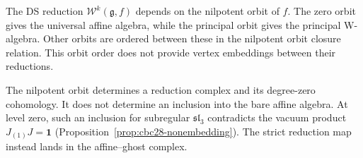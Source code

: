 The DS reduction $\mathcal{W}^k(\mathfrak{g},f)$ depends on the nilpotent orbit of $f$.
The zero orbit gives the universal affine algebra, while the principal orbit gives the principal W-algebra.
Other orbits are ordered between these in the nilpotent orbit closure relation.
This orbit order does not provide vertex embeddings between their reductions.

\begin{remark}
The nilpotent orbit determines a reduction complex and its degree-zero cohomology.
It does not determine an inclusion into the bare affine algebra.
At level zero, such an inclusion for subregular $\mathfrak{sl}_3$ contradicts the vacuum product $J_{(1)}J=\mathbf1$
(Proposition~\ref{prop:cbc28-nonembedding}).
The strict reduction map instead lands in the affine--ghost complex.
\end{remark}

